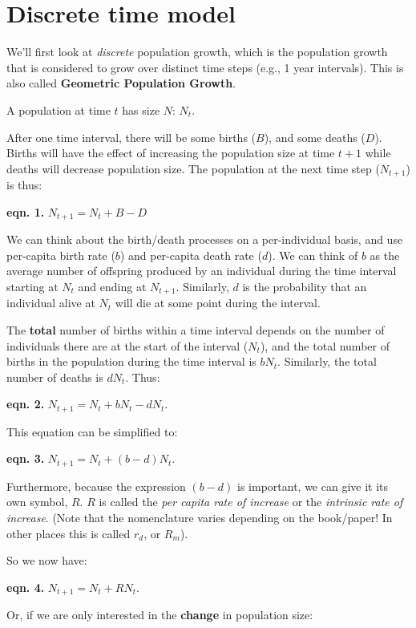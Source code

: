 \documentclass[
  a4paper]{book}
\begin{document}
\hypertarget{discrete-time-model}{%
\section{Discrete time model}\label{discrete-time-model}}

We'll first look at \emph{discrete} population growth, which is the population growth that is considered to grow over distinct time steps (e.g., 1 year intervals). This is also called \textbf{Geometric Population Growth}.

A population at time \(t\) has size \(N\): \(N_t\).

After one time interval, there will be some births (\(B\)), and some deaths (\(D\)). Births will have the effect of increasing the population size at time \(t+1\) while deaths will decrease population size. The population at the next time step (\(N_{t+1}\)) is thus:

\textbf{eqn. 1.} \(N_{t+1} = N_t + B - D\)

We can think about the birth/death processes on a per-individual basis, and use per-capita birth rate (\(b\)) and per-capita death rate (\(d\)). We can think of \(b\) as the average number of offspring produced by an individual during the time interval starting at \(N_t\) and ending at \(N_{t+1}\). Similarly, \(d\) is the probability that an individual alive at \(N_t\) will die at some point during the interval.

The \textbf{total} number of births within a time interval depends on the number of individuals there are at the start of the interval (\(N_t\)), and the total number of births in the population during the time interval is \(bN_t\). Similarly, the total number of deaths is \(dN_t\). Thus:

\textbf{eqn. 2.} \(N_{t+1} = N_t + bN_t - dN_t\).

This equation can be simplified to:

\textbf{eqn. 3.} \(N_{t+1} = N_t + (b-d)N_t\).

Furthermore, because the expression \((b-d)\) is important, we can give it its own symbol, \(R\). \(R\) is called the \emph{per capita rate of increase} or the \emph{intrinsic rate of increase}. (Note that the nomenclature varies depending on the book/paper! In other places this is called \(r_d\), or \(R_m\)).

So we now have:

\textbf{eqn. 4.} \(N_{t+1} = N_t + RN_t\).

Or, if we are only interested in the \textbf{change} in population size:
\end{document}
